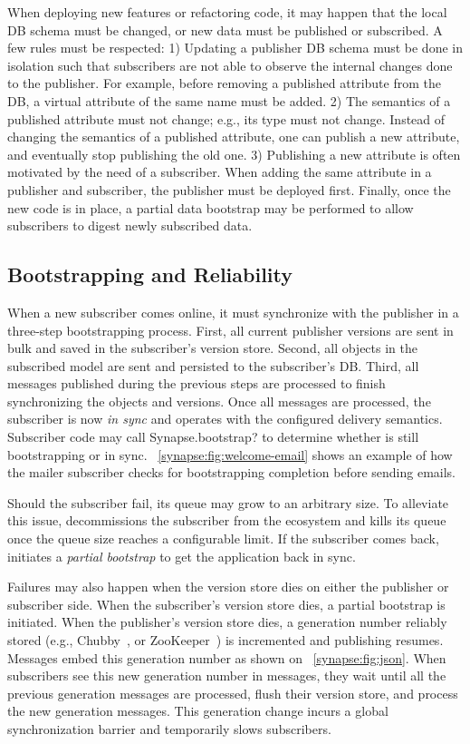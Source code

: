 When deploying new features or refactoring code, it may happen that the local DB
schema must be changed, or new data must be published or subscribed. A few rules
must be respected:
1) Updating a publisher DB schema must be done in isolation such that subscribers
are not able to observe the internal changes done to the publisher. For example,
before removing a published attribute from the DB, a virtual attribute of the
same name must be added.
2) The semantics of a published attribute must not change; e.g., its type must
not change.  Instead of changing the semantics of a published attribute, one can
publish a new attribute, and eventually stop publishing the old one.
3) Publishing a new attribute is often motivated by the need of a subscriber.
When adding the same attribute in a publisher and subscriber, the publisher
must be deployed first.
Finally, once the new code is in place, a partial data bootstrap may be
performed to allow subscribers to digest newly subscribed data.

\subsection{Bootstrapping and Reliability} \label{synapse:sec:arch:bootstrapping}

When a new subscriber comes online, it must synchronize with the publisher in a
three-step bootstrapping process. First, all current publisher versions are sent
in bulk and saved in the subscriber's version store. Second, all objects in the subscribed model are sent and persisted to the subscriber's DB. Third, all messages
published during the previous steps are processed to finish synchronizing the
objects and versions. Once all messages are processed, the subscriber is now
{\em in sync} and operates with the configured delivery semantics.
Subscriber code may call {\code Synapse.bootstrap?} to determine whether \synapse
is still bootstrapping or in sync. \F~\ref{synapse:fig:welcome-email} shows an example of
how the mailer subscriber checks for bootstrapping completion before sending emails.

Should the subscriber fail, its queue may grow to an arbitrary size. To
alleviate this issue, \synapse decommissions the subscriber from the
\synapse ecosystem and kills its queue once the queue size reaches a
configurable limit. If the subscriber comes back, \synapse initiates a
{\em partial bootstrap} to get the application back in sync.

Failures may also happen when the version store dies on either the publisher or subscriber
side. When the subscriber's version store dies, a partial bootstrap is initiated. When
the publisher's version store dies, a generation number reliably stored (e.g.,
Chubby~\cite{chubby:osdi}, or ZooKeeper~\cite{zookeeper}) is incremented
and publishing resumes. Messages embed this generation number as shown on
\F~\ref{synapse:fig:json}. When subscribers see this new generation number
 in messages, they wait until all the previous generation messages are
processed, flush their version store, and process the new generation messages.
This generation change incurs a global synchronization barrier and
temporarily slows subscribers.



